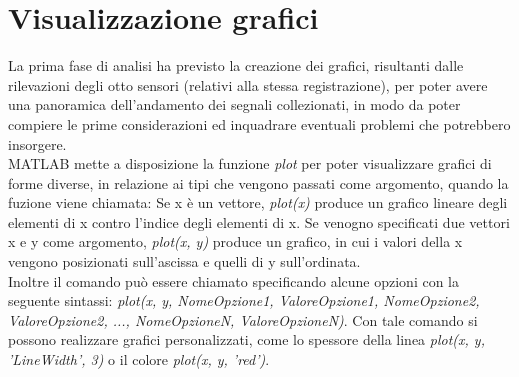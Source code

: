 \documentclass[a4paper, oneside]{book}
\begin{document}
\section{Visualizzazione grafici}
La prima fase di analisi ha previsto la creazione dei grafici, risultanti dalle rilevazioni degli otto sensori (relativi alla stessa registrazione), per poter avere una panoramica dell'andamento dei segnali collezionati, in modo da poter compiere le prime considerazioni ed inquadrare eventuali problemi che potrebbero insorgere.\\
MATLAB mette a disposizione la funzione \textit{plot} per poter visualizzare grafici di forme diverse, in relazione ai tipi che vengono passati come argomento, quando la fuzione viene chiamata:  Se x è un vettore, \textit{plot(x)} produce un grafico lineare degli elementi di x contro l’indice degli elementi di x. Se venogno specificati due vettori x e y come argomento,\textit{ plot(x, y) } produce un grafico, in cui i valori della x vengono posizionati sull'ascissa e quelli di y sull'ordinata. \\
Inoltre il comando può essere chiamato specificando alcune opzioni con la seguente sintassi: \textit{plot(x, y, NomeOpzione1, ValoreOpzione1, NomeOpzione2, ValoreOpzione2, ..., NomeOpzioneN, ValoreOpzioneN)}. Con tale comando si possono realizzare grafici personalizzati, come lo spessore della linea \textit{plot(x, y, 'LineWidth', 3)} o il colore \textit{plot(x, y, 'red')}.

\clearpage

\end{document}

